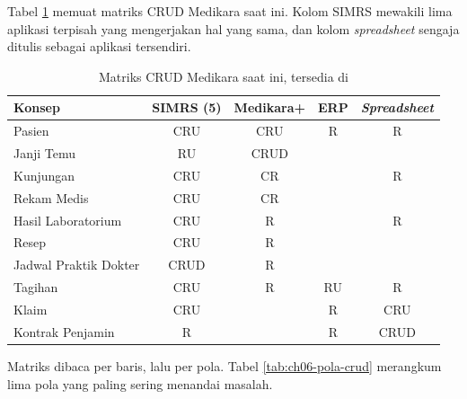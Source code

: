 Tabel \ref{tab:ch06-crud} memuat matriks CRUD Medikara saat ini. Kolom SIMRS
mewakili lima aplikasi terpisah yang mengerjakan hal yang sama, dan kolom
\textit{spreadsheet} sengaja ditulis sebagai aplikasi tersendiri.

\begin{table}[!htb]
  \centering
  \caption{Matriks CRUD Medikara saat ini, tersedia di
           }
  \label{tab:ch06-crud}
  \begin{tabularx}{\textwidth}{Xcccc}
    \hline
    \textbf{Konsep} & \textbf{SIMRS (5)} & \textbf{Medikara+} & \textbf{ERP} &
      \textbf{\textit{Spreadsheet}} \\
    \hline
    Pasien & CRU & CRU & R & R \\
    \hline
    Janji Temu & RU & CRUD & & \\
    \hline
    Kunjungan & CRU & CR & & R \\
    \hline
    Rekam Medis & CRU & CR & & \\
    \hline
    Hasil Laboratorium & CRU & R & & R \\
    \hline
    Resep & CRU & R & & \\
    \hline
    Jadwal Praktik Dokter & CRUD & R & & \\
    \hline
    Tagihan & CRU & R & RU & R \\
    \hline
    Klaim & CRU & & R & CRU \\
    \hline
    Kontrak Penjamin & R & & R & CRUD \\
    \hline
  \end{tabularx}
\end{table}

Matriks dibaca per baris, lalu per pola. Tabel \ref{tab:ch06-pola-crud}
merangkum lima pola yang paling sering menandai masalah.

